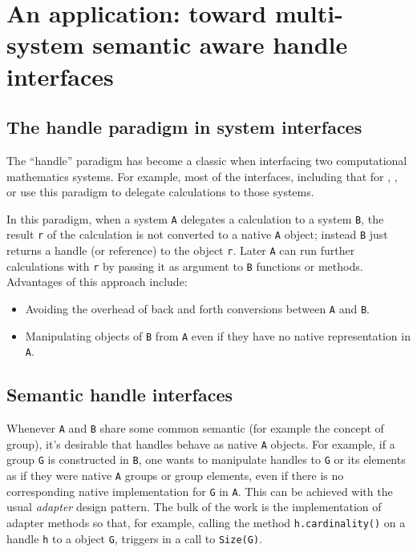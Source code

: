 \section{An application: toward multi-system semantic aware handle interfaces}

\subsection{The handle paradigm in system interfaces}\label{the-handle-paradigm-in-system-interfaces}

The ``handle'' paradigm has become a classic when interfacing two
computational mathematics systems. For example, most of the \Sage
interfaces, including that for \GAP, \Singular, or \Pari use this
paradigm to delegate calculations to those systems.

In this paradigm, when a system \texttt{A} delegates a calculation to a
system \texttt{B}, the result \texttt{r} of the calculation is not
converted to a native \texttt{A} object; instead \texttt{B} just returns
a handle (or reference) to the object \texttt{r}. Later \texttt{A} can
run further calculations with \texttt{r} by passing it as argument to
\texttt{B} functions or methods. Advantages of this approach include:

\begin{itemize}
\item Avoiding the overhead of back and forth conversions between
  \texttt{A} and \texttt{B}.
\item Manipulating objects of \texttt{B} from \texttt{A} even if they
  have no native representation in \texttt{A}.
\end{itemize}

\subsection{Semantic handle interfaces}\label{semantic-handle-interfaces}

Whenever \texttt{A} and \texttt{B} share some common semantic (for example the concept of
group), it's desirable that handles behave as native \texttt{A} objects. For example, if a
group \texttt{G} is constructed in \texttt{B}, one wants to manipulate handles to
\texttt{G} or its elements as if they were native \texttt{A} groups or group elements,
even if there is no corresponding native implementation for \texttt{G} in \texttt{A}.
This can be achieved with the usual \emph{adapter} design pattern. The bulk of the work is
the implementation of adapter methods so that, for example, calling the method
\texttt{h.cardinality()} on a \Sage handle \texttt{h} to a \GAP object \texttt{G},
triggers in \GAP a call to \texttt{Size(G)}.

